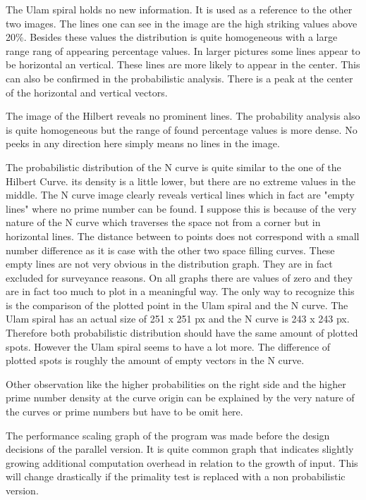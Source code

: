The Ulam spiral holds no new information. It is used as a reference to the other two images. The lines one can see in the image are the high striking values above 20\%. Besides these values the distribution is quite homogeneous with a large range rang of appearing percentage values. In larger pictures some lines appear to be horizontal an vertical. These lines are more likely to appear in the center. This can also be confirmed in the probabilistic analysis. There is a peak at the center of the horizontal and vertical vectors.

The image of the Hilbert reveals no prominent lines. The probability analysis also is quite homogeneous but the range of found percentage values is more dense. No peeks in any direction here simply means no lines in the image.

The probabilistic distribution of the N curve is quite similar to the one of the Hilbert Curve. its density is a little lower, but there are no extreme values in the middle. The N curve image clearly reveals vertical lines which in fact are "empty lines" where no prime number can be found. I suppose this is because of the very nature of the N curve which traverses the space not from a corner but in horizontal lines. The distance between to points does not correspond with a small number difference as it is case with the other two space filling curves.
These empty lines are not very obvious in the distribution graph. They are in fact excluded for surveyance reasons. On all graphs there are values of zero and they are in fact too much to plot in a meaningful way. The only way to recognize this is the comparison of the plotted point in the Ulam spiral and the N curve. The Ulam spiral has an actual size of 251 x 251 px and the N curve is 243 x 243 px. Therefore both probabilistic distribution should have the same amount of plotted spots. However the Ulam spiral seems to have a lot more. The difference of plotted spots is roughly the amount of empty vectors in the N curve.

Other observation like the higher probabilities on the right side and the higher prime number density at the curve origin can be explained by the very nature of the curves or prime numbers but have to be omit here.

The performance scaling graph of the program was made before the design decisions of the parallel version. It is quite common graph that indicates slightly growing additional computation overhead in relation to the growth of input. This will change drastically if the primality test is replaced with a non probabilistic version.


